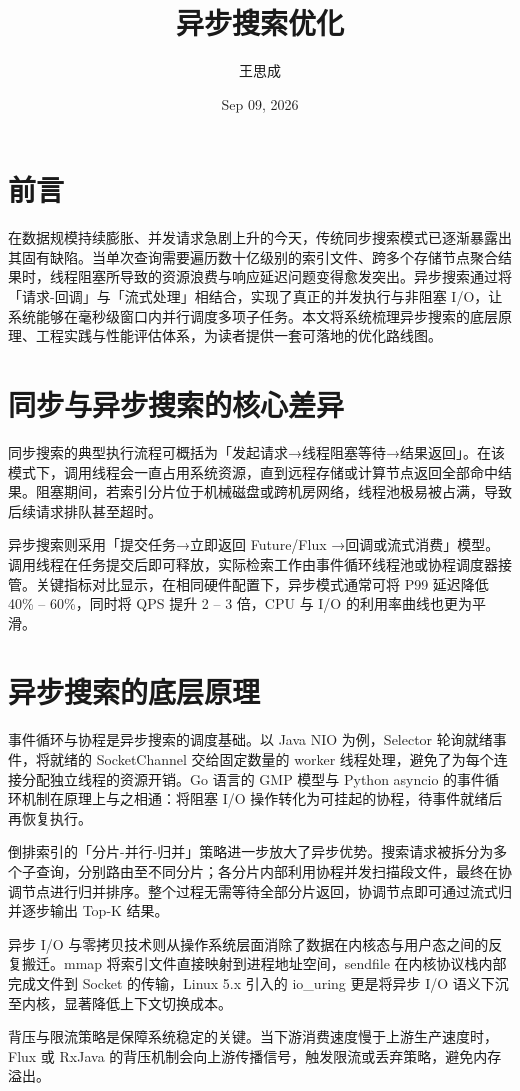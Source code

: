 \title{异步搜索优化}
\author{王思成}
\date{Sep 09, 2026}
\maketitle
\chapter{前言}
在数据规模持续膨胀、并发请求急剧上升的今天，传统同步搜索模式已逐渐暴露出其固有缺陷。当单次查询需要遍历数十亿级别的索引文件、跨多个存储节点聚合结果时，线程阻塞所导致的资源浪费与响应延迟问题变得愈发突出。异步搜索通过将「请求-回调」与「流式处理」相结合，实现了真正的并发执行与非阻塞 I/O，让系统能够在毫秒级窗口内并行调度多项子任务。本文将系统梳理异步搜索的底层原理、工程实践与性能评估体系，为读者提供一套可落地的优化路线图。\par
\chapter{同步与异步搜索的核心差异}
同步搜索的典型执行流程可概括为「发起请求→线程阻塞等待→结果返回」。在该模式下，调用线程会一直占用系统资源，直到远程存储或计算节点返回全部命中结果。阻塞期间，若索引分片位于机械磁盘或跨机房网络，线程池极易被占满，导致后续请求排队甚至超时。\par
异步搜索则采用「提交任务→立即返回 Future/Flux →回调或流式消费」模型。调用线程在任务提交后即可释放，实际检索工作由事件循环线程池或协程调度器接管。关键指标对比显示，在相同硬件配置下，异步模式通常可将 P99 延迟降低 40\%{} – 60\%{}，同时将 QPS 提升 2 – 3 倍，CPU 与 I/O 的利用率曲线也更为平滑。\par
\chapter{异步搜索的底层原理}
事件循环与协程是异步搜索的调度基础。以 Java NIO 为例，Selector 轮询就绪事件，将就绪的 SocketChannel 交给固定数量的 worker 线程处理，避免了为每个连接分配独立线程的资源开销。Go 语言的 GMP 模型与 Python asyncio 的事件循环机制在原理上与之相通：将阻塞 I/O 操作转化为可挂起的协程，待事件就绪后再恢复执行。\par
倒排索引的「分片-并行-归并」策略进一步放大了异步优势。搜索请求被拆分为多个子查询，分别路由至不同分片；各分片内部利用协程并发扫描段文件，最终在协调节点进行归并排序。整个过程无需等待全部分片返回，协调节点即可通过流式归并逐步输出 Top-K 结果。\par
异步 I/O 与零拷贝技术则从操作系统层面消除了数据在内核态与用户态之间的反复搬迁。mmap 将索引文件直接映射到进程地址空间，sendfile 在内核协议栈内部完成文件到 Socket 的传输，Linux 5.x 引入的 io\_{}uring 更是将异步 I/O 语义下沉至内核，显著降低上下文切换成本。\par
背压与限流策略是保障系统稳定的关键。当下游消费速度慢于上游生产速度时，Flux 或 RxJava 的背压机制会向上游传播信号，触发限流或丢弃策略，避免内存溢出。\par
